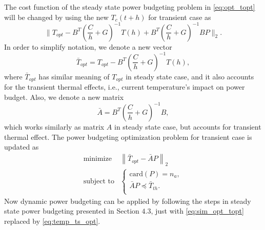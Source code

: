 The cost function of the steady state power budgeting problem in
\eqref{eq:opt_topt} will be changed by using the new $T_c(t+h)$ for
transient case as
\begin{equation}\label{eq:cost_trans}
\|T_{opt} -  B^{T}(\frac{C}{h}+G)^{-1}T(h)+B^{T}(\frac{C}{h}+G)^{-1}BP\|_2.
\end{equation}
In order to simplify notation, we denote a new vector  
\begin{equation}
\bar{T}_{opt}=T_{opt} - B^{T}(\frac{C}{h}+G)^{-1}T(h),
\end{equation}
where $\bar{T}_{opt}$ has similar meaning of
$T_{opt}$ in steady state case, and it also accounts for the transient
thermal effects, i.e., current temperature's impact on power
budget. Also, we denote a new matrix 
\begin{equation}
\bar{A} = B^{T}(\frac{C}{h}+G)^{-1}B, 
\end{equation}
which works similarly as matrix $A$ in steady
state case, but accounts for transient thermal effect. The power
budgeting optimization problem for transient case is updated as 
\begin{equation}\label{eq:temp_ts_opt}
\begin{split}
\text{minimize } &  \left \| \bar{T}_{opt}-\bar{A}P \right \|_{2}\\
\text{subject to} &\left\{
\begin{array}{lr}
\text{card}(P) = n_{a},\\
\bar{A}P \preceq \bar{T}_{th}.\\
\end{array}
\right.
\end{split}
\end{equation}
Now dynamic power budgeting can be
applied by following the steps in steady state power budgeting presented in
Section $4.3$, just with \eqref{eq:sim_opt_topt} replaced
by \eqref{eq:temp_ts_opt}.


